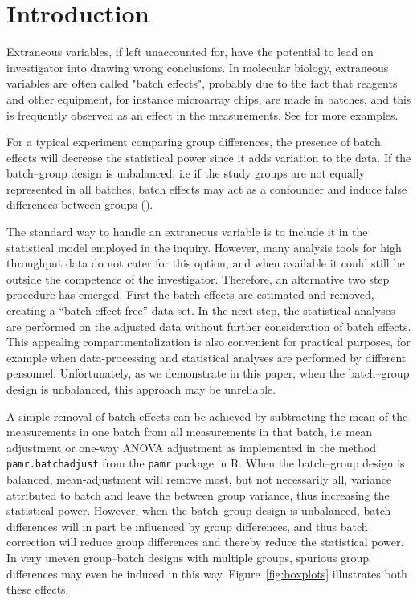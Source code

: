 \documentclass{bio}
\begin{document}
\section{Introduction}\label{intro}

Extraneous variables, if left unaccounted for, have the potential to lead an investigator into drawing wrong conclusions. In molecular biology, extraneous variables are often called "batch effects", probably due to the fact that reagents and other equipment, for instance microarray chips, are made in batches, and this is frequently observed as an effect in the measurements. See \citet{Luo2010} for more examples. 

For a typical experiment comparing group differences, the presence of batch effects will decrease the statistical power since it adds variation to the data. If the batch--group design is unbalanced, i.e if the study groups are not equally represented in all batches, batch effects may act as a confounder and induce false differences between groups (\citealp{Leek2010}).

The standard way to handle an extraneous variable is to include it in the statistical model employed in the inquiry. However, many analysis tools for high throughput data do not cater for this option, and when available it could still be outside the competence of the investigator. Therefore, an alternative two step procedure has emerged. First the batch effects are estimated and removed, creating a ``batch effect free'' data set. In the next step, the statistical analyses are performed on the adjusted data without further consideration of batch effects. This appealing compartmentalization is also convenient for practical purposes, for example when data-processing and statistical analyses are performed by different personnel. Unfortunately, as we demonstrate in this paper, when the batch--group design is unbalanced, this approach may be unreliable.

A simple removal of batch effects can be achieved by subtracting the mean of the measurements in one batch from all measurements in that batch, i.e mean adjustment or one-way ANOVA adjustment as implemented in the method \texttt{pamr.batchadjust} from the \texttt{pamr} package in R. When the batch--group design is balanced, mean-adjustment will remove most, but not necessarily all, variance attributed to batch and leave the between group variance, thus increasing the statistical power. However, when the batch--group design is unbalanced, batch differences will in part be influenced by group differences, and thus batch correction will reduce group differences and thereby reduce the statistical power. In very uneven group--batch designs with multiple groups, spurious group differences may even be induced in this way. Figure~\ref{fig:boxplots} illustrates both these effects.
\end{document}
